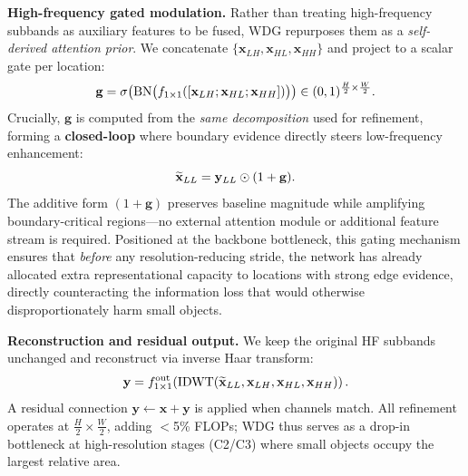 \documentclass{article}
\theoremstyle{plain}
\theoremstyle{definition}
\theoremstyle{remark}
\begin{document}
\noindent\textbf{High-frequency gated modulation.}  
Rather than treating high-frequency subbands as auxiliary features to be fused, WDG repurposes them as a \emph{self-derived attention prior}. We concatenate $\{\mathbf{x}_{LH},\mathbf{x}_{HL},\mathbf{x}_{HH}\}$ and project to a scalar gate per location:
\vspace{-0.2cm}
\begin{equation}
\label{eq:wdg_gate}
\mathbf{g} = \sigma\!\left(\mathrm{BN}\bigl(f_{1\times 1}([\mathbf{x}_{LH};\mathbf{x}_{HL};\mathbf{x}_{HH}])\bigr)\right) \in (0,1)^{\frac{H}{2}\times\frac{W}{2}}.
\vspace{-0.2cm}
\end{equation}
Crucially, $\mathbf{g}$ is computed from the \emph{same decomposition} used for refinement, forming a \textbf{closed-loop} where boundary evidence directly steers low-frequency enhancement:
\vspace{-0.2cm}
\begin{equation}
\label{eq:wdg_modulate}
\widetilde{\mathbf{x}}_{LL} = \mathbf{y}_{LL} \odot (1 + \mathbf{g}).
\vspace{-0.2cm}
\end{equation}
The additive form $(1+\mathbf{g})$ preserves baseline magnitude while amplifying boundary-critical regions---no external attention module or additional feature stream is required. Positioned at the backbone bottleneck, this gating mechanism ensures that \emph{before} any resolution-reducing stride, the network has already allocated extra representational capacity to locations with strong edge evidence, directly counteracting the information loss that would otherwise disproportionately harm small objects.

\noindent\textbf{Reconstruction and residual output.}  
We keep the original HF subbands unchanged and reconstruct via inverse Haar transform:
\vspace{-0.2cm}
\begin{equation}
\label{eq:wdg_recon}
\mathbf{y} = f_{1\times 1}^{\mathrm{out}}\!\left(\mathrm{IDWT}(\widetilde{\mathbf{x}}_{LL},\mathbf{x}_{LH},\mathbf{x}_{HL},\mathbf{x}_{HH})\right).
\vspace{-0.2cm}
\end{equation}
A residual connection $\mathbf{y}\leftarrow\mathbf{x}+\mathbf{y}$ is applied when channels match. All refinement operates at $\frac{H}{2}{\times}\frac{W}{2}$, adding $<$5\% FLOPs; WDG thus serves as a drop-in bottleneck at high-resolution stages (C2/C3) where small objects occupy the largest relative area.
\end{document}
